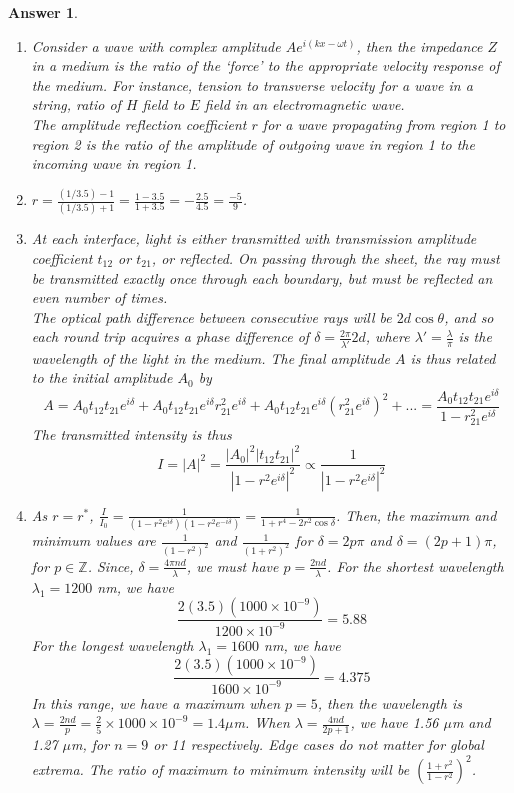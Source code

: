 \documentclass[a4paper]{article}
\newtheorem{ans}{Answer}[subsection]
\theoremstyle{new}
\begin{document}
\begin{ans}\leavevmode
\begin{enumerate}[label=(\roman*)]
\item Consider a wave with complex amplitude $Ae^{i(kx-\omega t)}$, then the impedance $Z$ in a medium is the ratio of the `force' to the appropriate velocity response of the medium. For instance, tension to transverse velocity for a wave in a string, ratio of $H$ field to $E$ field in an electromagnetic wave.\\[5pt]
The amplitude reflection coefficient $r$ for a wave propagating from region 1 to region 2 is the ratio of the amplitude of outgoing wave in region 1 to the incoming wave in region 1.
\item $r=\frac{(1/3.5)-1}{(1/3.5)+1}=\frac{1-3.5}{1+3.5}=-\frac{2.5}{4.5}=\frac{-5}{9}$.
\item At each interface, light is either transmitted with transmission amplitude coefficient $t_{12}$ or $t_{21}$, or reflected. On passing through the sheet, the ray must be transmitted exactly once through each boundary, but must be reflected an even number of times.\\[5pt]
The optical path difference between consecutive rays will be $2d\cos\theta$, and so each round trip acquires a phase difference of $\delta=\frac{2\pi}{\lambda'}2d$, where $\lambda'=\frac{\lambda}{\pi}$ is the wavelength of the light in the medium. The final amplitude $A$ is thus related to the initial amplitude $A_0$ by
$$A=A_0t_{12}t_{21}e^{i\delta}+A_0t_{12}t_{21}e^{i\delta}r^2_{21}e^{i\delta}+A_0t_{12}t_{21}e^{i\delta}(r^2_{21}e^{i\delta})^2+...=\frac{A_0t_{12}t_{21} e^{i\delta}}{1-r_{21}^2e^{i\delta}}$$
The transmitted intensity is thus
$$I=|A|^2=\frac{|A_0|^2|t_{12}t_{21}|^2}{|1-r^2e^{i\delta}|^2}\propto\frac{1}{|1-r^2e^{i\delta}|^2}$$
\item As $r=r^*$, $\frac{I}{I_0}=\frac{1}{(1-r^2e^{i\delta})(1-r^2e^{-i\delta})}=\frac{1}{1+r^4-2r^2\cos\delta}$. Then, the maximum and minimum values are $\frac{1}{(1-r^2)^2}$ and $\frac{1}{(1+r^2)^2}$ for $\delta=2p\pi$ and $\delta=(2p+1)\pi$, for $p\in\mathbb{Z}$. Since, $\delta=\frac{4\pi nd}{\lambda}$, we must have $p=\frac{2nd}{\lambda}$. For the shortest wavelength $\lambda_1=1200$ nm, we have $$\frac{2(3.5)(1000\times10^{-9})}{1200\times10^{-9}}=5.88$$
For the longest wavelength $\lambda_1=1600$ nm, we have $$\frac{2(3.5)(1000\times10^{-9})}{1600\times10^{-9}}=4.375$$
In this range, we have a maximum when $p=5$, then the wavelength is $\lambda=\frac{2n d}{p}=\frac{2}{5}\times 1000\times10^{-9}=1.4\mu$m. When $\lambda=\frac{4nd}{2p+1}$, we have 1.56 $\mu$m and 1.27 $\mu$m, for $n=9$ or 11 respectively. Edge cases do not matter for global extrema. The ratio of maximum to minimum intensity will be $(\frac{1+r^2}{1-r^2})^2$.

\end{enumerate}
\end{ans}
\end{document}
